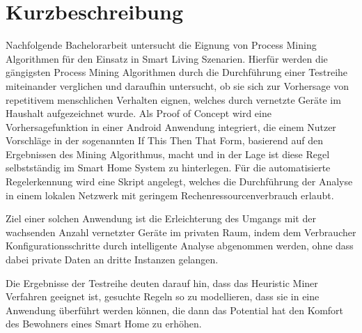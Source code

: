 \chapter*{Kurzbeschreibung}\vspace{17mm}
Nachfolgende Bachelorarbeit untersucht die Eignung von Process Mining Algorithmen für den Einsatz in Smart Living Szenarien. Hierfür werden die gängigsten Process Mining Algorithmen durch die Durchführung einer Testreihe miteinander verglichen und daraufhin untersucht, ob sie sich zur Vorhersage von repetitivem menschlichen Verhalten eignen, welches durch vernetzte Geräte im Haushalt aufgezeichnet wurde. Als Proof of Concept wird eine Vorhersagefunktion in einer Android Anwendung integriert, die einem Nutzer Vorschläge in der sogenannten If This Then That Form, basierend auf den Ergebnissen des Mining Algorithmus, macht und in der Lage ist diese Regel selbstständig im Smart Home System zu hinterlegen. Für die automatisierte Regelerkennung wird eine Skript angelegt, welches die Durchführung der Analyse in einem lokalen Netzwerk mit geringem Rechenressourcenverbrauch erlaubt. 

Ziel einer solchen Anwendung ist die Erleichterung des Umgangs mit der wachsenden Anzahl vernetzter Geräte im privaten Raum, indem dem Verbraucher Konfigurationsschritte durch intelligente Analyse abgenommen werden, ohne dass dabei private Daten an dritte Instanzen gelangen. 

Die Ergebnisse der Testreihe deuten darauf hin, dass das Heuristic Miner Verfahren geeignet ist, gesuchte Regeln so zu modellieren, dass sie in eine Anwendung überführt werden können, die dann das Potential hat den Komfort des Bewohners eines Smart Home zu erhöhen.